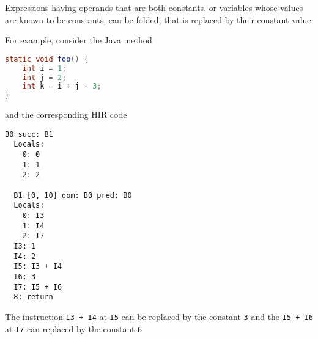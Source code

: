 \documentclass[8pt,a4paper,compress]{beamer}
\begin{document}
\begin{frame}[fragile]
\pause

Expressions having operands that are both constants, or variables whose values are known to be constants, can be folded, that is replaced by their constant value

\pause
\bigskip

For example, consider the Java method

\begin{lstlisting}[language=Java,style=focusin]
static void foo() {
    int i = 1;
    int j = 2;
    int k = i + j + 3;
}
\end{lstlisting}

and the corresponding HIR code

\begin{lstlisting}[language={},style=focusin]
  B0 succ: B1
  Locals:
    0: 0
    1: 1
    2: 2

  B1 [0, 10] dom: B0 pred: B0
  Locals:
    0: I3
    1: I4
    2: I7
  I3: 1
  I4: 2
  I5: I3 + I4
  I6: 3
  I7: I5 + I6
  8: return
\end{lstlisting}

\pause
\bigskip

The instruction \lstinline{I3 + I4} at \lstinline{I5} can be replaced by the constant \lstinline{3} and the \lstinline{I5 + I6} at \lstinline{I7} can replaced by the constant \lstinline{6}
\end{frame}
\end{document}
